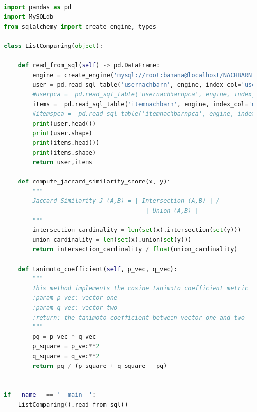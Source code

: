 \begin{lstlisting}[language=Python, caption= Komponente ListComparing, label=lst:ListComparing]

import pandas as pd
import MySQLdb
from sqlalchemy import create_engine, types

class ListComparing(object):

    def read_from_sql(self) -> pd.DataFrame:
        engine = create_engine('mysql://root:banana@localhost/NACHBARN')
        user = pd.read_sql_table('usernachbarn', engine, index_col='userId')
        #userpca =  pd.read_sql_table('usernachbarnpca', engine, index_col='userId')
        items =  pd.read_sql_table('itemnachbarn', engine, index_col='movieId')
        #itemspca =  pd.read_sql_table('itemnachbarnpca', engine, index_col='movieId')
        print(user.head())
        print(user.shape)
        print(items.head())
        print(items.shape)
        return user,items

    def compute_jaccard_similarity_score(x, y):
        """
        Jaccard Similarity J (A,B) = | Intersection (A,B) | /
                                        | Union (A,B) |
        """
        intersection_cardinality = len(set(x).intersection(set(y)))
        union_cardinality = len(set(x).union(set(y)))
        return intersection_cardinality / float(union_cardinality)

    def tanimoto_coefficient(self, p_vec, q_vec):
        """
        This method implements the cosine tanimoto coefficient metric
        :param p_vec: vector one
        :param q_vec: vector two
        :return: the tanimoto coefficient between vector one and two
        """
        pq = p_vec * q_vec
        p_square = p_vec**2
        q_square = q_vec**2
        return pq / (p_square + q_square - pq)


if __name__ == '__main__':
    ListComparing().read_from_sql()





\end{lstlisting}



